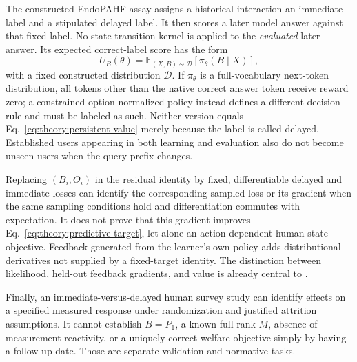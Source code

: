 The constructed EndoPAHF assay assigns a historical interaction an immediate
label and a stipulated delayed label. It then scores a later model answer
against that fixed label. No state-transition kernel is applied to the
\emph{evaluated} later answer. Its expected correct-label score has the form
\begin{equation}
 U_B(\theta)=\mathbb E_{(X,B)\sim\mathcal D}
                   [\pi_\theta(B\mid X)],
 \label{eq:theory:predictive-target}
\end{equation}
with a fixed constructed distribution $\mathcal D$. If $\pi_\theta$ is a
full-vocabulary next-token distribution, all tokens other than the native
correct answer token receive reward zero; a constrained option-normalized
policy instead defines a different decision rule and must be labeled as such.
Neither version equals Eq.~\eqref{eq:theory:persistent-value} merely because
the label is called delayed. Established users appearing in both learning
and evaluation also do not become unseen users when the query prefix changes.

Replacing $(B_i,O_i)$ in the residual identity by fixed, differentiable
delayed and immediate losses can identify the corresponding sampled loss
or its gradient when the same sampling conditions hold and differentiation
commutes with expectation. It does not prove that this gradient improves
Eq.~\eqref{eq:theory:predictive-target}, let alone an action-dependent human
state objective. Feedback generated from the learner's own policy adds
distributional derivatives not supplied by a fixed-target identity.
The distinction between likelihood, held-out feedback gradients, and value
is already central to \citet{privilegedlikelihood}.

Finally, an immediate-versus-delayed human survey study can identify effects
on a specified measured response under randomization and justified attrition
assumptions. It cannot establish $B=P_1$, a known full-rank $M$, absence of
measurement reactivity, or a uniquely correct welfare objective simply by
having a follow-up date. Those are separate validation and normative tasks.
